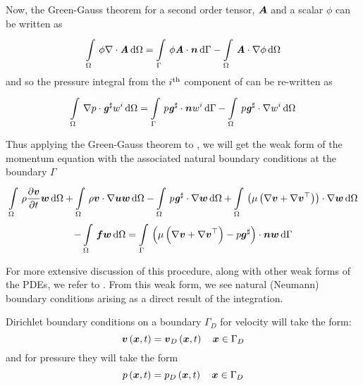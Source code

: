 Now, the Green-Gauss theorem for a second order tensor, $ \boldsymbol{A} $ and a
scalar $\phi$ can be written as
\begin{equation}
  \gint{\Omega}{}{\phi\divergence{}{\tensor{A}}}{\Omega}=\gint{\Gamma}{}{\dotprod{\phi\tensor{A}}{\vectr{n}}}{\Gamma}-\gint{\Omega}{}{\dotprod{\tensor{A}}{\gradient{}{\phi}}}{\Omega}
\end{equation}
and so the pressure integral from the ${i}^{\text{th}}$ component of
 can be re-written as
\begin{equation}
  \gint{\Omega}{}{\dotprod{\gradient{}{p}}{\sharptensor{\tensor{g}}}w^{i}}{\Omega}=\gint{\Gamma}{}{\dotprod{p\sharptensor{\tensor{g}}}{\vectr{n}}w^{i}}{\Gamma}-\gint{\Omega}{}{\dotprod{p\sharptensor{\tensor{g}}}{\gradient{}{w^{i}}}}{\Omega}
\end{equation}

Thus applying the Green-Gauss theorem to
, we will get
the weak form of the momentum equation with the associated natural boundary
conditions at the boundary $\Gamma$ \ie
\begin{multline}
  \gint{\Omega}{}{\rho\delby{\vectr{v}}{t}{\vectr{w}}}{\Omega}
  +\gint{\Omega}{}{\dotprod{\rho\vectr{v}}{\gradient{}{\vectr{u}}}\vectr{w}}{\Omega}
  -\gint{\Omega}{}{\dotprod{p\sharptensor{\tensor{g}}}{\gradient{}{\vectr{w}}}}{\Omega}
  +\gint{\Omega}{}{\dotprod{\pbrac{\mu\pbrac{\gradient{}{\vectr{v}}+\gradient{}{\transpose{\vectr{v}}}}}}{\gradient{}{\vectr{w}}}}{\Omega} \\
  -\gint{\Omega}{}{\vectr{f}\vectr{w}}{\Omega}
  =\gint{\Gamma}{}{\dotprod{\pbrac{\mu\pbrac{\gradient{}{\vectr{v}}+\transpose{\gradient{}{\vectr{v}}}}-
        p\sharptensor{\vectr{g}}}}{\vectr{n}}\vectr{w}}{\Gamma}
  \label{eqn:GalerkinNSE}
\end{multline}

For more extensive discussion of this procedure, along with other weak forms
of the PDEs, we refer to \cite{gresho:2000}. From this weak form, we see
natural (Neumann) boundary conditions arising as a direct result of the
integration.

Dirichlet boundary conditions on a boundary
$\Gamma_D$ for velocity will take the form:
\begin{equation}
  \fnof{\vectr{v}}{\vectr{x},t} = \fnof{\vectr{v}_{D}}{\vectr{x},t} \quad \vectr{x}\in\Gamma_{D}\\
  \label{eqn:NSEVelocityDirichletBC} 
\end{equation}
and for pressure they will take the form
\begin{equation}
  \fnof{p}{\vectr{x},t} = \fnof{p_{D}}{\vectr{x},t} \quad \vectr{x}\in\Gamma_{D}\\
  \label{eqn:NSEPressureDirichletBC} 
\end{equation}

